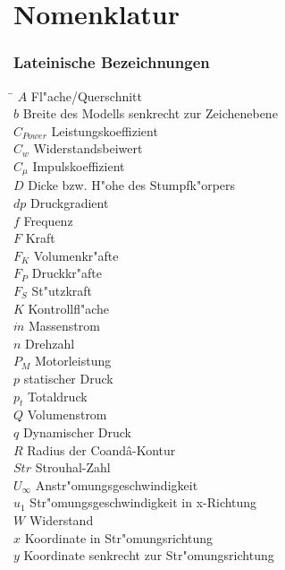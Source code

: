\chapter*{Nomenklatur}

\subsection*{Lateinische Bezeichnungen}
\begin{tabbing}
\hspace*{2cm}\=\kill
$A$ \> Fl"ache/Querschnitt \\[0.2ex]
$b$ \> Breite des Modells senkrecht zur Zeichenebene \\[0.2ex]
$C_{Power}$ \> Leistungskoeffizient \\[0.2ex]
$C_w$ \> Widerstandsbeiwert \\[0.2ex]
$C_{\mu}$ \> Impulskoeffizient \\[0.2ex]
$D$ \> Dicke bzw. H"ohe des Stumpfk"orpers \\[0.2ex]
$dp$ \> Druckgradient \\[0.2ex]
$f$ \> Frequenz \\[0.2ex]
$F$ \> Kraft \\[0.2ex]
$F_{K}$ \> Volumenkr"afte \\[0.2ex]
$F_{P}$ \> Druckkr"afte \\[0.2ex]
$F_{S}$ \> St"utzkraft \\[0.2ex]
$K$ \> Kontrollfl"ache \\[0.2ex]
$\dot{m}$ \> Massenstrom \\[0.2ex]
$n$ \> Drehzahl \\[0.2ex]
$P_M$ \> Motorleistung \\[0.2ex]
$p$ \> statischer Druck \\[0.2ex]
$p_t$ \> Totaldruck \\[0.2ex]
$Q$ \> Volumenstrom \\[0.2ex]
$q$ \> Dynamischer Druck \\[0.2ex]
$R$ \> Radius der Coand\^{a}-Kontur \\[0.2ex]
$Str$ \> Strouhal-Zahl \\[0.2ex]
$U_{\infty}$ \> Anstr"omungsgeschwindigkeit \\[0.2ex]
$u_1$ \> Str"omungsgeschwindigkeit in x-Richtung \\[0.2ex]
$W$ \> Widerstand \\[0.2ex]
$x$ \> Koordinate in Str"omungsrichtung \\[0.2ex]
$y$ \> Koordinate senkrecht zur Str"omungsrichtung \\[0.2ex]
\end{tabbing}



